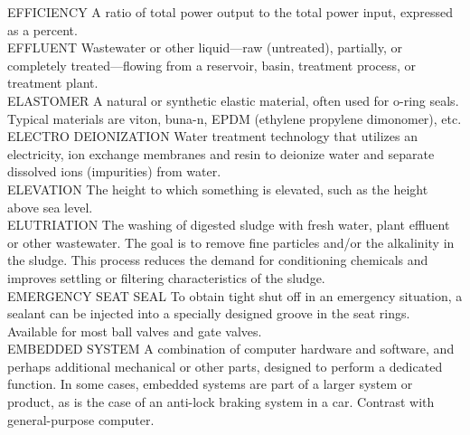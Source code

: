 \documentclass{article}
\begin{document}
EFFICIENCY
A ratio of total power output to the total power input, expressed as a percent.
\vspace{0.3cm}\\
EFFLUENT
Wastewater or other liquid—raw (untreated), partially, or completely treated—flowing from a reservoir, basin, treatment process, or treatment plant. 
\vspace{0.3cm}\\
ELASTOMER
A natural or synthetic elastic material, often used for o-ring seals. Typical materials are viton, buna-n, EPDM (ethylene propylene dimonomer), etc.
\vspace{0.3cm}\\
ELECTRO DEIONIZATION
Water treatment technology that utilizes an electricity, ion exchange membranes and resin to deionize water and separate dissolved ions (impurities) from water.
\vspace{0.3cm}\\
ELEVATION
The height to which something is elevated, such as the height above sea level. 
\vspace{0.3cm}\\
ELUTRIATION
The washing of digested sludge with fresh water, plant effluent or other wastewater. The goal is to remove fine particles and/or the alkalinity in the sludge. This process reduces the demand for conditioning chemicals and improves settling or filtering characteristics of the sludge.
\vspace{0.3cm}\\
EMERGENCY SEAT SEAL
To obtain tight shut off in an emergency situation, a sealant can be injected into a specially designed groove in the seat rings. Available for most ball valves and gate valves.
\vspace{0.3cm}\\
EMBEDDED SYSTEM
A combination of computer hardware and software, and perhaps additional mechanical or other parts, designed to perform a dedicated function. In some cases, embedded systems are part of a larger system or product, as is the case of an anti-lock braking system in a car. Contrast with general-purpose computer.
\vspace{0.3cm}\\
\end{document}
